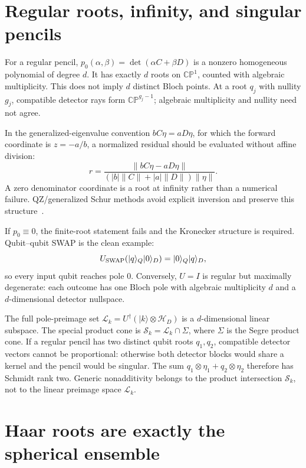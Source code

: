 \documentclass[aps,prl,onecolumn,10pt,notitlepage,superscriptaddress,nofootinbib]{revtex4-2}
\newcommand{\CP}{\mathbb{CP}}
\begin{document}
\section{Regular roots, infinity, and singular pencils}

For a regular pencil, $p_0(\alpha,\beta)=\det(\alpha C+\beta D)$ is a nonzero homogeneous polynomial of degree $d$.  It has exactly $d$ roots on $\CP^1$, counted with algebraic multiplicity.  This does not imply $d$ distinct Bloch points.  At a root $q_j$ with nullity $g_j$, compatible detector rays form $\CP^{g_j-1}$; algebraic multiplicity and nullity need not agree.

In the generalized-eigenvalue convention $bC\eta=aD\eta$, for which the forward coordinate is $z=-a/b$, a normalized residual should be evaluated without affine division:
\begin{equation}
r=\frac{\|bC\eta-aD\eta\|}
{(|b|\|C\|+|a|\|D\|)\|\eta\|}.                                               \label{seq:resid}
\end{equation}
A zero denominator coordinate is a root at infinity rather than a numerical failure.  QZ/generalized Schur methods avoid explicit inversion and preserve this structure~\cite{MolerStewart1973}.

If $p_0\equiv0$, the finite-root statement fails and the Kronecker structure is required.  Qubit--qubit SWAP is the clean example:
\begin{equation}
U_{\rm SWAP}(|q\rangle_Q|0\rangle_D)=|0\rangle_Q|q\rangle_D,
\end{equation}
so every input qubit reaches pole $0$.  Conversely, $U=I$ is regular but maximally degenerate: each outcome has one Bloch pole with algebraic multiplicity $d$ and a $d$-dimensional detector nullspace.

The full pole-preimage set $\mathcal L_k=U^\dagger(|k\rangle\otimes\mathcal H_D)$ is a $d$-dimensional linear subspace.  The special product cone is $\mathcal S_k=\mathcal L_k\cap\Sigma$, where $\Sigma$ is the Segre product cone.  If a regular pencil has two distinct qubit roots $q_1,q_2$, compatible detector vectors cannot be proportional: otherwise both detector blocks would share a kernel and the pencil would be singular.  The sum $q_1\otimes\eta_1+q_2\otimes\eta_2$ therefore has Schmidt rank two.  Generic nonadditivity belongs to the product intersection $\mathcal S_k$, not to the linear preimage space $\mathcal L_k$.

\section{Haar roots are exactly the spherical ensemble}
\end{document}
